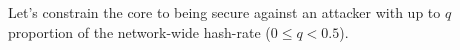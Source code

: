 





Let's constrain the core to being secure against an attacker with up to $q$ proportion of the network-wide hash-rate ($0 \le q < 0.5$).

